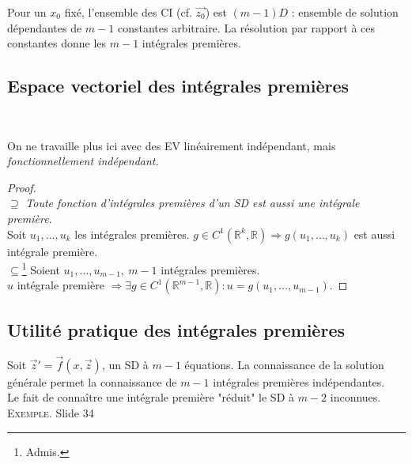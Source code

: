 	Pour un $x_0$ fixé, l'ensemble des CI (cf. $\vec{z_0}$) est $(m-1)D$ : 
	ensemble de solution dépendantes de $m-1$ constantes arbitraire. La 
	résolution par rapport à ces constantes donne les $m-1$ intégrales 
	premières.\\
	
	\setcounter{subsection}{8}
	\subsection{Espace vectoriel des intégrales premières}	
	\ 
	
	
	On ne travaille plus ici avec des EV linéairement indépendant, 
	mais \textit{fonctionnellement indépendant.}
	
	\begin{proof}\ \\
	$\supseteq$ \textit{Toute fonction d'intégrales premières d'un SD est 
	aussi une intégrale première}.\\
	Soit $u_1,\dots,u_k$ les intégrales premières. $g \in C^1(\mathbb{R}^k,
	\mathbb{R}) \Rightarrow g(u_1,\dots,u_k)$ est aussi intégrale première.\\
		
	$\subseteq$\footnote{Admis.} Soient $u_1,\dots, u_{m-1},\ m-1$ 
	intégrales premières.\\
	$u$ intégrale première $\Rightarrow \exists g \in C^1(\mathbb{R}^{m-1},
	\mathbb{R}) : u = g(u_1,\dots,u_{m-1})$.
	\end{proof}
	
	\subsection{Utilité pratique des intégrales premières}
	Soit $\vec{z}'=\vec{f}(x,\vec{z})$, un SD à $m-1$ équations. La 
	connaissance de la solution générale permet la connaissance de $m-1$ 
	intégrales premières indépendantes. \\
	Le fait de connaître une intégrale première "réduit" le SD à $m-2$ 
	inconnues.\\
	\textsc{Exemple.} Slide 34
	
